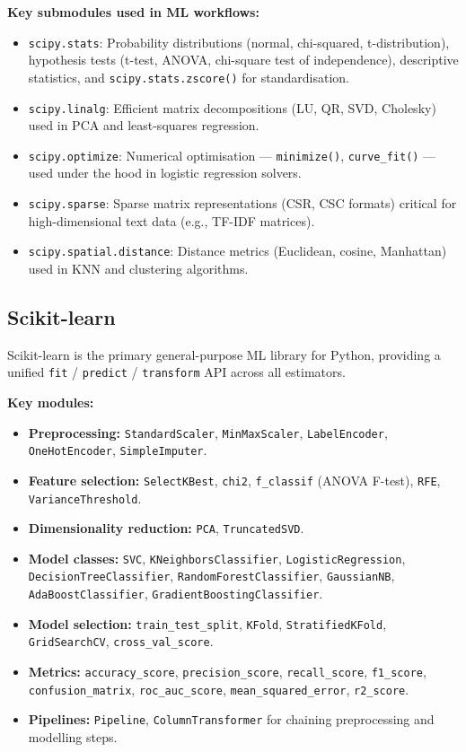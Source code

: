 \documentclass[12pt,a4paper]{article}
\begin{document}
\textbf{Key submodules used in ML workflows:}
\begin{itemize}[noitemsep]
  \item \texttt{scipy.stats}: Probability distributions (normal, chi-squared, t-distribution),
        hypothesis tests (t-test, ANOVA, chi-square test of independence), descriptive statistics,
        and \texttt{scipy.stats.zscore()} for standardisation.
  \item \texttt{scipy.linalg}: Efficient matrix decompositions (LU, QR, SVD, Cholesky)
        used in PCA and least-squares regression.
  \item \texttt{scipy.optimize}: Numerical optimisation --- \texttt{minimize()},
        \texttt{curve\_fit()} --- used under the hood in logistic regression solvers.
  \item \texttt{scipy.sparse}: Sparse matrix representations (CSR, CSC formats)
        critical for high-dimensional text data (e.g., TF-IDF matrices).
  \item \texttt{scipy.spatial.distance}: Distance metrics (Euclidean, cosine, Manhattan)
        used in KNN and clustering algorithms.
\end{itemize}

\subsection{Scikit-learn}

Scikit-learn is the primary general-purpose ML library for Python, providing a unified
\texttt{fit} / \texttt{predict} / \texttt{transform} API across all estimators.

\textbf{Key modules:}
\begin{itemize}[noitemsep]
  \item \textbf{Preprocessing:} \texttt{StandardScaler}, \texttt{MinMaxScaler},
        \texttt{LabelEncoder}, \texttt{OneHotEncoder}, \texttt{SimpleImputer}.
  \item \textbf{Feature selection:} \texttt{SelectKBest}, \texttt{chi2},
        \texttt{f\_classif} (ANOVA F-test), \texttt{RFE}, \texttt{VarianceThreshold}.
  \item \textbf{Dimensionality reduction:} \texttt{PCA}, \texttt{TruncatedSVD}.
  \item \textbf{Model classes:} \texttt{SVC}, \texttt{KNeighborsClassifier},
        \texttt{LogisticRegression}, \texttt{DecisionTreeClassifier},
        \texttt{RandomForestClassifier}, \texttt{GaussianNB},
        \texttt{AdaBoostClassifier}, \texttt{GradientBoostingClassifier}.
  \item \textbf{Model selection:} \texttt{train\_test\_split}, \texttt{KFold},
        \texttt{StratifiedKFold}, \texttt{GridSearchCV}, \texttt{cross\_val\_score}.
  \item \textbf{Metrics:} \texttt{accuracy\_score}, \texttt{precision\_score},
        \texttt{recall\_score}, \texttt{f1\_score}, \texttt{confusion\_matrix},
        \texttt{roc\_auc\_score}, \texttt{mean\_squared\_error}, \texttt{r2\_score}.
  \item \textbf{Pipelines:} \texttt{Pipeline}, \texttt{ColumnTransformer}
        for chaining preprocessing and modelling steps.
\end{itemize}
\end{document}

